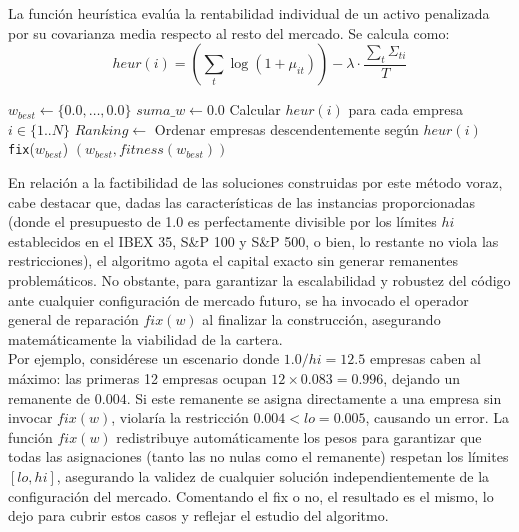 La función heurística evalúa la rentabilidad individual de un activo penalizada por su covarianza media respecto al resto del mercado. Se calcula como:
\begin{equation}
    heur(i) = \left( \sum_{t} \log(1+\mu_{it}) \right) - \lambda \cdot \frac{\sum_{t}\Sigma_{ti}}{T}
\end{equation}

\begin{algorithm}[H]
\SetAlgoLined
{}
 $w_{best} \leftarrow \{0.0, \dots, 0.0\}$\;
 $suma\_w \leftarrow 0.0$\;
 Calcular $heur(i)$ para cada empresa $i \in \{1..N\}$\;
 $Ranking \leftarrow$ Ordenar empresas descendentemente según $heur(i)$\;
 \texttt{fix}($w_{best}$)\;
 \Return $(w_{best}, fitness(w_{best}))$\;
 \caption{Algoritmo Constructivo Greedy}
\end{algorithm}
\vspace{1cm}
En relación a la factibilidad de las soluciones construidas por este método voraz, cabe destacar que, dadas las características de las instancias proporcionadas (donde el presupuesto de 1.0 es perfectamente divisible por los límites $hi$ establecidos en el IBEX 35, S\&P 100 y S\&P 500, o bien, lo restante no viola las restricciones), el algoritmo agota el capital exacto sin generar remanentes problemáticos. No obstante, para garantizar la escalabilidad y robustez del código ante cualquier configuración de mercado futuro, se ha invocado el operador general de reparación $fix(w)$ al finalizar la construcción, asegurando matemáticamente la viabilidad de la cartera.\\

Por ejemplo, considérese un escenario donde $1.0 / hi = 12.5$ empresas caben al máximo: las primeras 12 empresas ocupan $12 \times 0.083 = 0.996$, dejando un remanente de $0.004$. Si este remanente se asigna directamente a una empresa sin invocar $fix(w)$, violaría la restricción $0.004 < lo = 0.005$, causando un error. La función $fix(w)$ redistribuye automáticamente los pesos para garantizar que todas las asignaciones (tanto las no nulas como el remanente) respetan los límites $[lo, hi]$, asegurando la validez de cualquier solución independientemente de la configuración del mercado. Comentando el fix o no, el resultado es el mismo, lo dejo para cubrir estos casos y reflejar el estudio del algoritmo. \\

